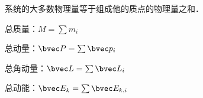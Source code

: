 
系统的大多数物理量等于组成他的质点的物理量之和．

总质量：$M=\sum m_i$

总动量：$\bvec P = \sum \bvec p_i$

总角动量：$\bvec L = \sum \bvec L_i$

总动能：$\bvec E_k = \sum \bvec E_{k,i}$
